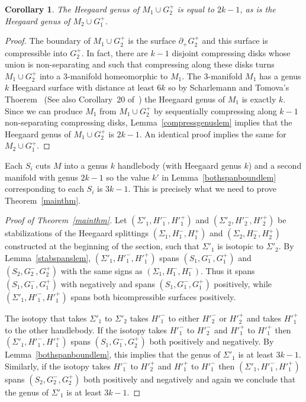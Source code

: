\documentclass[12pt]{amsart}
\theoremstyle{plain}
\newtheorem{Coro}[Thm]{Corollary}
\theoremstyle{definition}
\begin{document}
\begin{Coro}
\label{hgencoro}
The Heegaard genus of $M_1 \cup G^+_2$ is equal to $2k-1$, as is the Heegaard genus of $M_2 \cup G^+_1$.
\end{Coro}

\begin{proof}
The boundary of $M_1 \cup G^+_2$ is the surface $\partial_+ G^+_2$ and this surface is compressible into $G^+_2$.  In fact, there are $k-1$ disjoint compressing disks whose union is non-separating and such that compressing along these disks turns $M_1 \cup G^+_2$ into a 3-manifold homeomorphic to $M_1$.
The 3-manifold $M_1$ has a genus $k$ Heegaard surface with distance at least $6k$ so by Scharlemann and Tomova's Thoerem~\cite{st:dist} (See also Corollary~20 of~\cite{me:stabs}) the Heegaard genus of $M_1$ is exactly $k$.  Since we can produce $M_1$ from $M_1 \cup G^+_2$ by sequentially compressing along $k - 1$ non-separating compressing disks, Lemma~\ref{compressgenuslem} implies that the Heegaard genus of $M_1 \cup G^+_2$ is $2k-1$.  An identical proof implies the same for $M_2 \cup G^+_1$.
\end{proof}

Each $S_i$ cuts $M$ into a genus $k$ handlebody (with Heegaard genus $k$) and a second manifold with genus $2k-1$ so the value $k'$ in Lemma~\ref{bothspanboundlem} corresponding to each $S_i$ is $3k-1$.  This is precisely what we need to prove Theorem~\ref{mainthm}.

\begin{proof}[Proof of Theorem~\ref{mainthm}]
Let $(\Sigma'_1, H'^-_1, H'^+_1)$ and $(\Sigma'_2, H'^-_2, H'^+_2)$ be stabilizations of the Heegaard splittings $(\Sigma_1, H^-_1, H^+_1)$ and $(\Sigma_2, H^-_2, H^+_2)$ constructed at the beginning of the section, such that $\Sigma'_1$ is isotopic to $\Sigma'_2$.  By Lemma~\ref{stabspanslem}, $(\Sigma'_1, H'^-_1, H'^+_1)$ spans $(S_1, G^-_1, G^+_1)$ and $(S_2, G^-_2, G^+_2)$ with the same signs as $(\Sigma_1,H^-_1, H^-_1)$.  Thus it spans $(S_1, G^-_1, G^+_1)$ with negatively and spans $(S_1, G^-_1, G^+_1)$ positively, while $(\Sigma'_1, H'^-_1, H'^+_1)$ spans both bicompressible surfaces positively.

The isotopy that takes $\Sigma'_1$ to $\Sigma'_2$ takes $H'^-_1$ to either $H'^-_2$ or $H'^+_2$ and takes $H'^+_1$ to the other handlebody.  If the isotopy takes $H'^-_1$ to $H'^-_2$ and $H'^+_1$ to $H'^+_1$ then $(\Sigma'_1, H'^-_1, H'^+_1)$ spans $(S_1, G^-_1, G^+_2)$ both positively and negatively.  By Lemma~\ref{bothspanboundlem}, this implies that the genus of $\Sigma'_1$ is at least $3k-1$.  Similarly, if the isotopy takes $H'^-_1$ to $H'^+_2$ and $H'^+_1$ to $H'^-_1$ then $(\Sigma'_1, H'^-_1, H'^+_1)$ spans $(S_2, G^-_2, G^+_2)$ both positively and negatively and again we conclude that the genus of $\Sigma'_1$ is at least $3k-1$.
\end{proof}
\end{document}

